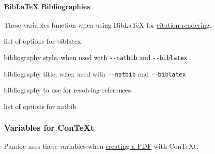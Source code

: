 \documentclass[
  a4paper,
]{article}
\providecommand{\tightlist}{%
  \setlength{\itemsep}{0pt}\setlength{\parskip}{0pt}}
\begin{document}
\hypertarget{biblatex-bibliographies}{%
\paragraph{BibLaTeX Bibliographies}\label{biblatex-bibliographies}}

These variables function when using BibLaTeX for
\protect\hyperlink{citation-rendering}{citation rendering}.

\begin{description}
\tightlist
\item[\texttt{biblatexoptions}]
list of options for biblatex
\item[\texttt{biblio-style}]
bibliography style, when used with \texttt{-\/-natbib} and
\texttt{-\/-biblatex}
\item[\texttt{biblio-title}]
bibliography title, when used with \texttt{-\/-natbib} and
\texttt{-\/-biblatex}
\item[\texttt{bibliography}]
bibliography to use for resolving references
\item[\texttt{natbiboptions}]
list of options for natbib
\end{description}

\hypertarget{variables-for-context}{%
\subsubsection{Variables for ConTeXt}\label{variables-for-context}}

Pandoc uses these variables when
\protect\hyperlink{creating-a-pdf}{creating a PDF} with ConTeXt.
\end{document}
